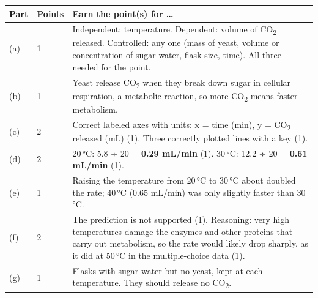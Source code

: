 \documentclass[11pt,letterpaper]{article}
\begin{document}

\begin{center}
\begin{tabularx}{\linewidth}{@{}llY@{}}
\toprule
Part & Points & Earn the point(s) for \dots{} \\
\midrule
(a) & 1 & Independent: temperature. Dependent: volume of CO\textsubscript{2} released. Controlled: any one (mass of yeast, volume or concentration of sugar water, flask size, time). All three needed for the point. \\
(b) & 1 & Yeast release CO\textsubscript{2} when they break down sugar in cellular respiration, a metabolic reaction, so more CO\textsubscript{2} means faster metabolism. \\
(c) & 2 & Correct labeled axes with units: x = time (min), y = CO\textsubscript{2} released (mL) (1). Three correctly plotted lines with a key (1). \\
(d) & 2 & 20\,°C: 5.8 ÷ 20 = \textbf{0.29 mL/min} (1). 30\,°C: 12.2 ÷ 20 = \textbf{0.61 mL/min} (1). \\
(e) & 1 & Raising the temperature from 20\,°C to 30\,°C about doubled the rate; 40\,°C (0.65 mL/min) was only slightly faster than 30\,°C. \\
(f) & 2 & The prediction is not supported (1). Reasoning: very high temperatures damage the enzymes and other proteins that carry out metabolism, so the rate would likely drop sharply, as it did at 50\,°C in the multiple-choice data (1). \\
(g) & 1 & Flasks with sugar water but no yeast, kept at each temperature. They should release no CO\textsubscript{2}. \\
\bottomrule
\end{tabularx}
\end{center}
\end{document}
